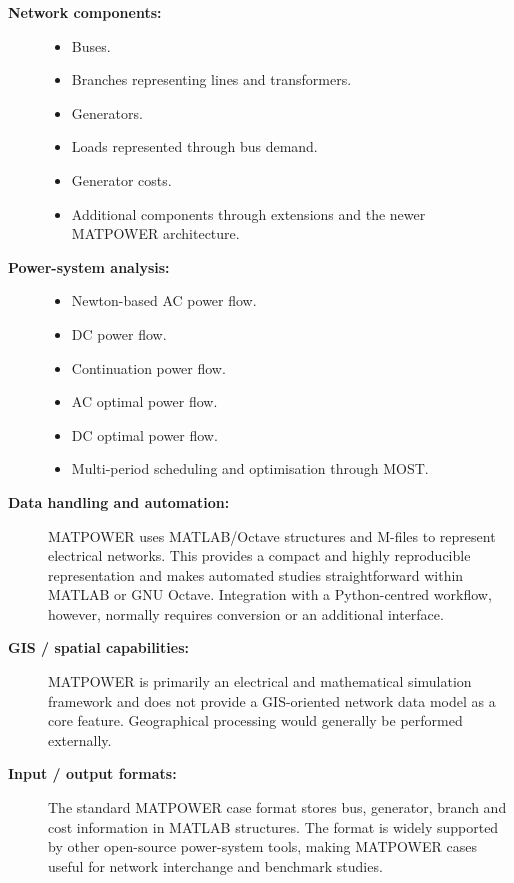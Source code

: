 \begin{description}
    \item[\textbf{Network components:}] \hfill
    \begin{itemize}
        \item Buses.
        \item Branches representing lines and transformers.
        \item Generators.
        \item Loads represented through bus demand.
        \item Generator costs.
        \item Additional components through extensions and the newer
        MATPOWER architecture.
    \end{itemize}

    \item[\textbf{Power-system analysis:}] \hfill
    \begin{itemize}
        \item Newton-based AC power flow.
        \item DC power flow.
        \item Continuation power flow.
        \item AC optimal power flow.
        \item DC optimal power flow.
        \item Multi-period scheduling and optimisation through MOST.
    \end{itemize}

    \item[\textbf{Data handling and automation:}]
    MATPOWER uses MATLAB/Octave structures and M-files to represent electrical
    networks. This provides a compact and highly reproducible representation
    and makes automated studies straightforward within MATLAB or GNU Octave.
    Integration with a Python-centred workflow, however, normally requires
    conversion or an additional interface.

    \item[\textbf{GIS / spatial capabilities:}]
    MATPOWER is primarily an electrical and mathematical simulation framework
    and does not provide a GIS-oriented network data model as a core feature.
    Geographical processing would generally be performed externally.

    \item[\textbf{Input / output formats:}]
    The standard MATPOWER case format stores bus, generator, branch and cost
    information in MATLAB structures. The format is widely supported by other
    open-source power-system tools, making MATPOWER cases useful for network
    interchange and benchmark studies.


\end{description}

